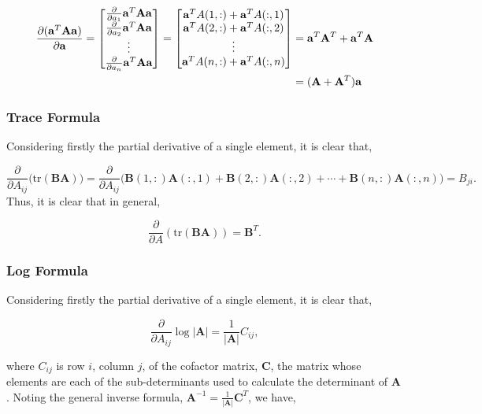\documentclass[11pt]{amsart}
\begin{document}
\begin{align}
\frac{\partial(\mathbf{a}^T\mathbf{A}\mathbf{a})}{\partial\mathbf{a}} =
\begin{bmatrix}
\frac{\partial}{\partial a_1} \mathbf{a}^T\mathbf{A}\mathbf{a} \\
\frac{\partial}{\partial a_2} \mathbf{a}^T\mathbf{A}\mathbf{a} \\
\vdots \\
\frac{\partial}{\partial a_n} \mathbf{a}^T\mathbf{A}\mathbf{a} \\
\end{bmatrix}
=
\begin{bmatrix}
\mathbf{a}^TA(1, :) + \mathbf{a}^TA(:, 1) \\
\mathbf{a}^TA(2, :) + \mathbf{a}^TA(:, 2) \\
\vdots \\
\mathbf{a}^TA(n, :) + \mathbf{a}^TA(:, n) \\
\end{bmatrix}
&= \mathbf{a}^T\mathbf{A}^T + \mathbf{a}^T\mathbf{A} \notag \\
&= (\mathbf{A} + \mathbf{A}^T)\mathbf{a} \notag
\end{align}

\subsubsection{Trace Formula}

Considering firstly the partial derivative of a single element, it is clear that,

$$\frac{\partial}{\partial A_{ij}}\big(\text{tr}(\mathbf{B}\mathbf{A})\big) = \frac{\partial}{\partial A_{ij}}\big(\mathbf{B}(1, :)\mathbf{A}(:, 1) + \mathbf{B}(2, :)\mathbf{A}(:, 2) + \cdots + \mathbf{B}(n, :)\mathbf{A}(:, n)\big) = B_{ji}.$$ Thus, it is clear that in general, 

$$\frac{\partial}{\partial A} (\text{tr}(\mathbf{BA})) = \mathbf{B}^T.$$

\subsubsection{Log Formula}

Considering firstly the partial derivative of a single element, it is clear that,

$$\frac{\partial}{\partial A_{ij}}\log|\mathbf{A}| = \frac{1}{|\mathbf{A}|}C_{ij},$$

where $C_{ij}$ is row $i$, column $j$, of the cofactor matrix, $\mathbf{C}$, the matrix whose elements are each of the sub-determinants used to calculate the determinant of $\mathbf{A}$. Noting the general inverse formula, $\mathbf{A}^{-1} = \frac{1}{|\mathbf{A}|}\mathbf{C}^T$, we have,
\end{document}

